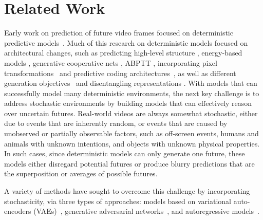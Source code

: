 \documentclass{article} \usepackage{iclr2020_conference,times}
\begin{document}
\section{Related Work}
\label{related}



Early work on prediction of future video frames focused on deterministic predictive models~\citep{ranzato2014video, srivastava2015unsupervised,vondrick2015anticipating,xingjian2015convolutional,boots2014learning}. Much of this research on deterministic models focused on architectural changes, such as predicting high-level structure \citep{villegas2017learning}, energy-based models \citep{Xie_2017_CVPR}, generative cooperative nets \citep{Xie_2020}, ABPTT \citep{Xie_2019}, incorporating pixel transformations~\citep{finn2016unsupervised,de2016dynamic,liu2017video} and predictive coding architectures~\citep{prednet}, as well as different generation objectives~\citep{mathieu2015deep,vondrick2017generating,optical_flow_pred} and disentangling representations \citep{villegas2017decomposing,denton2017unsupervised}.
With models that can successfully model many deterministic environments, the next key challenge is to address stochastic environments by building models that can effectively reason over uncertain futures.
Real-world videos are always somewhat stochastic, either due to events that are inherently random, or events that are caused by unobserved or partially observable factors, such as off-screen events, humans and animals with unknown intentions, and objects with unknown physical properties. In such cases, since deterministic models can only generate one future, these models either disregard potential futures or produce blurry predictions that are the superposition or averages of possible futures.

A variety of methods have sought to overcome this challenge by incorporating stochasticity, via three types of approaches: models based on variational auto-encoders (VAEs)~\citep{kingma2013auto,rezende2014stochastic}, generative adversarial networks~\citep{goodfellow2014generative}, and autoregressive models~\citep{hochreiter1997long,graves2013generating,pixelrnn,oord2016conditional,van2016wavenet}.
\end{document}
